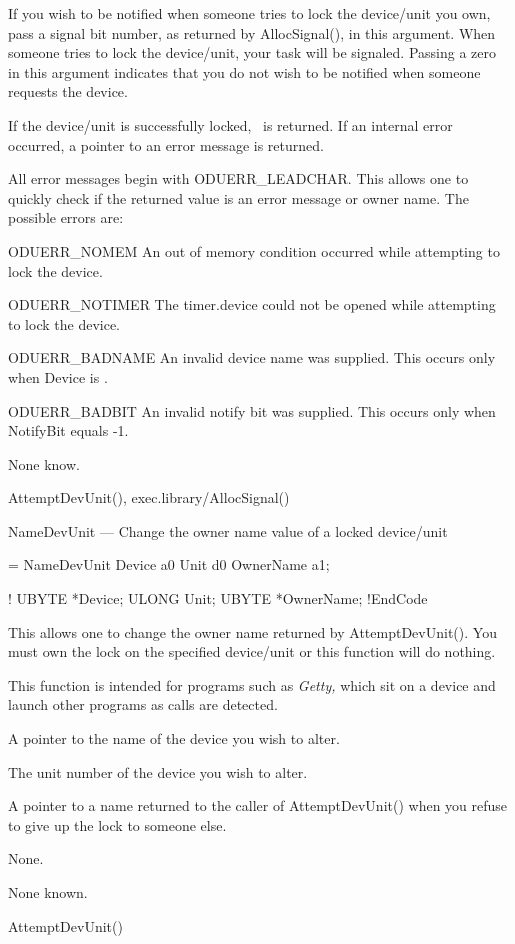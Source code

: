 If you wish to be notified when someone tries to lock the device/unit you
own, pass a signal bit number, as returned by {\TT AllocSignal()}, in this
argument.  When someone tries to lock the device/unit, your task will be
signaled.  Passing a zero in this argument indicates that you do not wish
to be notified when someone requests the device.
\EndSub

If the device/unit is successfully locked, \NULL\ is returned.  If an
internal error occurred, a pointer to an error message is returned.

All error messages begin with {\TT ODUERR\_LEADCHAR}.  This allows one to
quickly check if the returned value is an error message or owner name.  The
possible errors are:

\Item ODUERR\_NOMEM
An out of memory condition occurred while attempting to lock the device.

\Item ODUERR\_NOTIMER
The timer.device could not be opened while attempting to lock the device.

\Item ODUERR\_BADNAME
An invalid device name was supplied.  This occurs only when {\TT Device} is
\NULL.

\Item ODUERR\_BADBIT
An invalid notify bit was supplied.  This occurs only when {\TT NotifyBit}
equals -1.

None know.

{\TT AttemptDevUnit()},
{\TT exec.library/AllocSignal()}


NameDevUnit --- Change the owner name value of a locked device/unit

\Synopsis = NameDevUnit Device a0 Unit d0 OwnerName a1;

\BeginCode!
UBYTE   *Device;
ULONG    Unit;
UBYTE   *OwnerName;
!EndCode

This allows one to change the owner name returned by {\TT
AttemptDevUnit()}.  You must own the lock on the specified device/unit or
this function will do nothing.

This function is intended for programs such as {\sl Getty,} which sit on
a device and launch other programs as calls are detected.

A pointer to the name of the device you wish to alter.
\EndSub

The unit number of the device you wish to alter.
\EndSub

A pointer to a name returned to the caller of {\TT AttemptDevUnit()} when
you refuse to give up the lock to someone else.
\EndSub

None.

None known.

{\TT AttemptDevUnit()}


\TableOfContents
\bye

